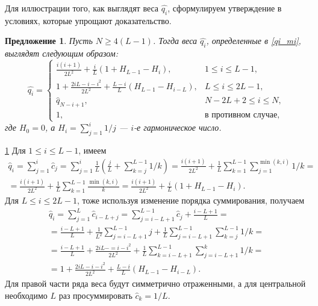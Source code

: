 \documentclass[12pt,a4paper,fleqn,leqno]{article}
\newtheorem{proposition}{Предложение}
\begin{document}
Для иллюстрации того, как выглядят веса $\hat{q_i}$, сформулируем утверждение в условиях, которые упрощают доказательство.

\begin{proposition} \label{myserweightstat}
Пусть $N \ge 4(L-1)$. Тогда веса $\hat{q_i}$, определенные в \eqref{qi_mi},
выглядят следующим образом:
\begin{equation*}
\hat{q_i} = \begin{cases}
\frac{i(i+1)}{2 L^2} + \frac{i}{L}(1 + H_{L-1} - H_i), &1 \le i \le L-1, \\
1 + \frac{2iL-i-i^2}{2L^2} + \frac{L-i}{L}(H_{L-1} - H_{i - L}), & L \le i \le 2L-1, \\
\hat{q}_{N-i+1}, &N-2L+2 \le i \le N, \\
1, &\text{в противном случае},
\end{cases}
\end{equation*}
где $H_0 = 0$, а $H_i = \sum_{j=1}^i 1/j$ --- $i$-е гармоническое число.
\end{proposition}

\begin{proof5}{\ref{myserweightstat}}
Для $1 \le i \le L-1$, имеем
\begin{gather*}
\hat{q}_i = \sum_{j=1}^i \hat{c}_j = \sum_{j=1}^i \frac{1}{L}\left(\frac{j}{L} + \sum_{k=j}^{L-1}1/k\right)\! =
\frac{i(i+1)}{2L^2}+\frac{1}{L} \sum_{k = 1}^{L-1} \sum_{j=1}^{\min(k,i)} 1/k =\\= \frac{i(i+1)}{2L^2}+\frac{1}{L} \sum_{k = 1}^{L-1} \frac{\min(k,i)}{k} = \frac{i(i+1)}{2 L^2} + \frac{i}{L}(1 + H_{L-1} - H_i).
\end{gather*}
Для $L \le i \le 2L-1$, тоже используя изменение порядка суммирования, получаем
\begin{gather*}
\hat{q}_i = \sum_{j = 1}^L \hat{c}_{i-L+j} = \sum_{j = i - L + 1}^{L - 1} \hat{c}_j + \frac{i - L + 1}{L} =\\
=\frac{i - L + 1}{L} + \frac{1}{L^2} \sum_{j = i - L + 1}^{L-1}j + \frac{1}{L} \sum_{j = i-L + 1}^{L-1} \sum_{k=j}^{L-1}1/k =\\
=\frac{i - L + 1}{L} + \frac{2iL - =i - i^2}{2L^2} + \frac{1}{L} \sum_{k = i - L + 1}^{L - 1} \sum_{j = i - L + 1}^k 1/k =\\
=1 + \frac{2iL-i-i^2}{2L^2} + \frac{L-i}{L}(H_{L-1} - H_{i - L}).
\end{gather*}
Для правой части ряда веса будут симметрично отраженными, а для центральной необходимо $L$ раз просуммировать $\hat{c}_k = 1/L$.
\end{proof5}
\end{document}

